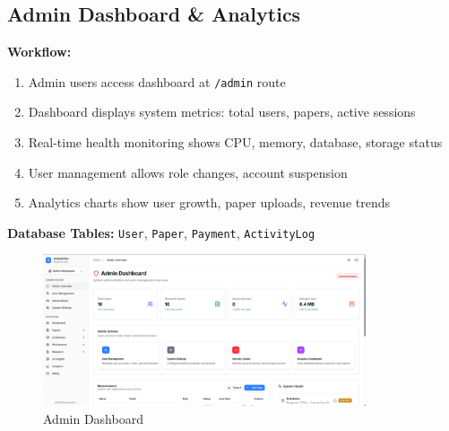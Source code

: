 \subsection{Admin Dashboard \& Analytics}

\textbf{Workflow:}
\begin{enumerate}[leftmargin=*,topsep=3pt,itemsep=2pt]
    \item Admin users access dashboard at \texttt{/admin} route
    \item Dashboard displays system metrics: total users, papers, active sessions
    \item Real-time health monitoring shows CPU, memory, database, storage status
    \item User management allows role changes, account suspension
    \item Analytics charts show user growth, paper uploads, revenue trends
\end{enumerate}

\textbf{Database Tables:} \texttt{User}, \texttt{Paper}, \texttt{Payment}, \texttt{ActivityLog}

\begin{figure}[H]
\centering
\includegraphics[width=0.85\textwidth]{images/screenshots/admin_overview.png}
\caption{Admin Dashboard}
\label{fig:admin}
\end{figure}

